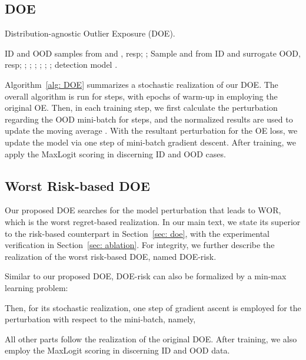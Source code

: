 \documentclass{article} \usepackage{iclr2022_conference,times}
\begin{document}
\subsection{DOE}
\begin{algorithm}[!t]
   \caption{Distribution-agnostic Outlier Exposure (DOE).}
   \label{alg: DOE}
\begin{algorithmic}
   ID and OOD samples from  and , resp;
  \STATE ;
  \STATE Sample  and  from ID and surrogate OOD, resp;
  \STATE ;
    \IF{}
            \STATE ;
            \STATE ;
        \ENDFOR
        \STATE ;
        \STATE ;
    \ELSE
        \STATE ;
    \ENDIF
 \ENDFOR
  detection model .
\end{algorithmic}
\end{algorithm}


Algorithm~\ref{alg: DOE} summarizes a stochastic realization of our DOE. The overall algorithm is run for  steps, with  epochs of warm-up in employing the original OE. Then, in each training step, we first calculate the perturbation  regarding the OOD mini-batch for  steps, and the normalized results are used to update the moving average . With the resultant perturbation  for the OE loss, we update the model via one step of mini-batch gradient descent. After training, we apply the MaxLogit scoring in discerning ID and OOD cases. 


\subsection{Worst Risk-based DOE}


Our proposed DOE searches for the model perturbation that leads to WOR, which is the worst regret-based realization. In our main text, we state its superior to the risk-based counterpart in Section~\ref{sec: doe}, with the experimental verification in Section~\ref{sec: ablation}. For integrity,  we further describe the realization of the worst risk-based DOE, named DOE-risk. 


Similar to our proposed DOE, DOE-risk can also be formalized by a min-max learning problem:

Then, for its stochastic realization, one step of gradient ascent is employed for the perturbation with respect to the mini-batch, namely,

All other parts follow the realization of the original DOE. After training, we also employ the MaxLogit scoring in discerning ID and OOD data. 
\end{document}
